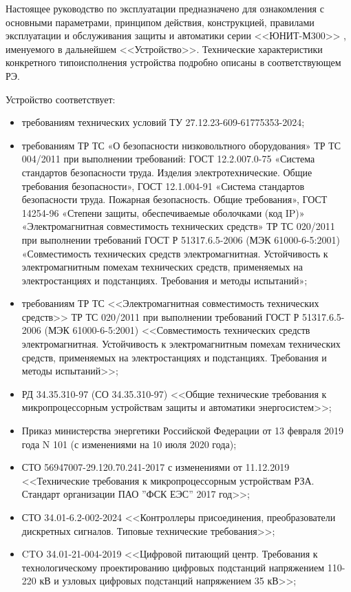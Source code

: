 \par
Настоящее руководство по эксплуатации предназначено для ознакомления с основными параметрами, принципом действия, конструкцией, правилами эксплуатации и обслуживания защиты и автоматики серии <<ЮНИТ-М300>> , именуемого в дальнейшем <<Устройство>>. Технические характеристики конкретного типоисполнения устройства подробно описаны в соответствующем РЭ.

\par
Устройство соответствует:
\begin{itemize}
\item требованиям технических условий ТУ 27.12.23-609-61775353-2024;
\item требованиям ТР ТС «О безопасности низковольтного оборудования» ТР ТС 004/2011 при 
выполнении требований: ГОСТ 12.2.007.0-75 «Система стандартов безопасности труда. 
Изделия электротехнические. Общие требования безопасности», ГОСТ 12.1.004-91 
«Система стандартов безопасности труда. Пожарная безопасность. Общие требования», 
ГОСТ 14254-96 «Степени защиты, обеспечиваемые оболочками (код IP)» 
«Электромагнитная совместимость технических средств» ТР ТС 020/2011 при выполнении 
требований ГОСТ Р 51317.6.5-2006 (МЭК 61000-6-5:2001) «Совместимость технических 
средств электромагнитная. Устойчивость к электромагнитным помехам технических средств, 
применяемых на электростанциях и подстанциях. Требования и методы испытаний»;
\item требованиям ТР ТС <<Электромагнитная совместимость технических средств>> ТР ТС 020/2011 при выполнении требований ГОСТ Р 51317.6.5-2006 (МЭК 61000-6-5:2001) <<Совместимость технических средств электромагнитная. Устойчивость к электромагнитным помехам технических средств, применяемых на электростанциях и подстанциях. Требования и методы испытаний>>;
\item РД 34.35.310-97 (СО 34.35.310-97) <<Общие технические требования к микропроцессорным устройствам защиты и автоматики энергосистем>>;
\item Приказ министерства энергетики Российской Федерации от 13 февраля 2019 года N 101 (с изменениями на 10 июля 2020 года);
\item СТО 56947007-29.120.70.241-2017 с изменениями от 11.12.2019 <<Технические требования к микропроцессорным устройствам РЗА. Стандарт организации ПАО ''ФСК ЕЭС'' 2017 год>>;
\item СТО 34.01-6.2-002-2024 <<Контроллеры присоединения, преобразователи дискретных сигналов. Типовые технические требования>>;
\item CTO 34.01-21-004-2019 <<Цифровой питающий центр. Требования к технологическому проектированию цифровых подстанций напряжением 110-220 кВ и узловых цифровых подстанций напряжением 35 кВ>>;

\end{itemize}
